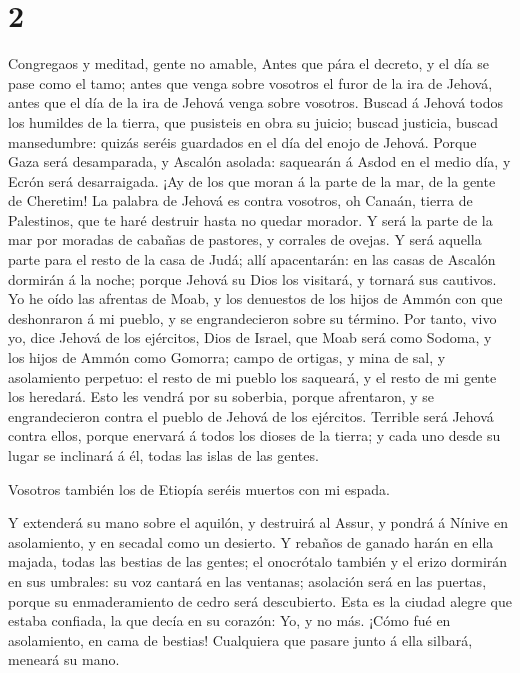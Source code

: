 \hypertarget{section-1}{%
\section{2}\label{section-1}}

 Congregaos y meditad, gente no amable,  Antes
que pára el decreto, y el día se pase como el tamo; antes que venga
sobre vosotros el furor de la ira de Jehová, antes que el día de la ira
de Jehová venga sobre vosotros.  Buscad á Jehová todos los
humildes de la tierra, que pusisteis en obra su juicio; buscad justicia,
buscad mansedumbre: quizás seréis guardados en el día del enojo de
Jehová.  Porque Gaza será desamparada, y Ascalón asolada:
saquearán á Asdod en el medio día, y Ecrón será desarraigada.
 ¡Ay de los que moran á la parte de la mar, de la gente de
Cheretim! La palabra de Jehová es contra vosotros, oh Canaán, tierra de
Palestinos, que te haré destruir hasta no quedar morador.  Y
será la parte de la mar por moradas de cabañas de pastores, y corrales
de ovejas.  Y será aquella parte para el resto de la casa de
Judá; allí apacentarán: en las casas de Ascalón dormirán á la noche;
porque Jehová su Dios los visitará, y tornará sus cautivos. 
Yo he oído las afrentas de Moab, y los denuestos de los hijos de Ammón
con que deshonraron á mi pueblo, y se engrandecieron sobre su término.
 Por tanto, vivo yo, dice Jehová de los ejércitos, Dios de
Israel, que Moab será como Sodoma, y los hijos de Ammón como Gomorra;
campo de ortigas, y mina de sal, y asolamiento perpetuo: el resto de mi
pueblo los saqueará, y el resto de mi gente los heredará. 
Esto les vendrá por su soberbia, porque afrentaron, y se engrandecieron
contra el pueblo de Jehová de los ejércitos.  Terrible será
Jehová contra ellos, porque enervará á todos los dioses de la tierra; y
cada uno desde su lugar se inclinará á él, todas las islas de las
gentes.

 Vosotros también los de Etiopía seréis muertos con mi
espada.

 Y extenderá su mano sobre el aquilón, y destruirá al
Assur, y pondrá á Nínive en asolamiento, y en secadal como un desierto.
 Y rebaños de ganado harán en ella majada, todas las
bestias de las gentes; el onocrótalo también y el erizo dormirán en sus
umbrales: su voz cantará en las ventanas; asolación será en las puertas,
porque su enmaderamiento de cedro será descubierto.  Esta
es la ciudad alegre que estaba confiada, la que decía en su corazón: Yo,
y no más. ¡Cómo fué en asolamiento, en cama de bestias! Cualquiera que
pasare junto á ella silbará, meneará su mano.

